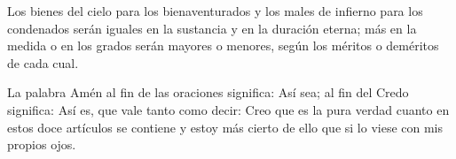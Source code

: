  Los bienes del cielo para los
bienaventurados y los males de infierno para los condenados serán iguales en la
sustancia y en la duración eterna; más en la medida o en los grados serán mayores
o menores, según los méritos o deméritos de cada cual.

 La palabra
Amén al fin de las oraciones significa: Así sea; al fin del Credo significa: Así es,
que vale tanto como decir: Creo que es la pura verdad cuanto en estos doce
artículos se contiene y estoy más cierto de ello que si lo viese con mis propios
ojos.